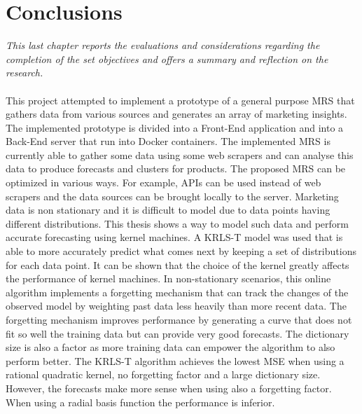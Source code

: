 \chapter{Conclusions}

\textsl{This last chapter reports the evaluations and considerations regarding the completion of the set objectives and offers a summary and reflection on the research.}
\\\\
This project attempted to implement a prototype of a general purpose \ac{MRS} that gathers data from various sources and generates an array of marketing insights. The implemented prototype is divided into a Front-End application and into a Back-End server that run into Docker containers. The implemented \ac{MRS} is currently able to gather some data using some web scrapers and can analyse this data to produce forecasts and clusters for products. The proposed \ac{MRS} can be optimized in various ways. For example, APIs can be used instead of web scrapers and the data sources can be brought locally to the server. Marketing data is non stationary and it is difficult to model due to data points having different distributions. This thesis shows a way to model such data and perform accurate forecasting using kernel machines. A \ac{KRLS}-T model was used that is able to more accurately predict what comes next by keeping a set of distributions for each data point. It can be shown that the choice of the kernel greatly affects the performance of kernel machines. In non-stationary scenarios, this online algorithm implements a forgetting mechanism that can track the changes of the observed model by weighting past data less heavily than more recent data. The forgetting mechanism improves performance by generating a curve that does not fit so well the training data but can provide very good forecasts. The dictionary size is also a factor as more training data can empower the algorithm to also perform better. The \ac{KRLS}-T algorithm achieves the lowest MSE when using a rational quadratic kernel, no forgetting factor and a large dictionary size. However, the forecasts make more sense when using also a forgetting factor. When using a radial basis function the performance is inferior. 




